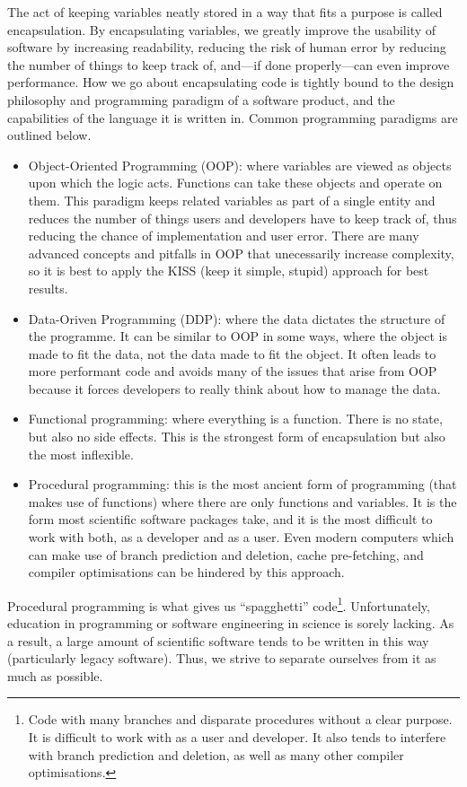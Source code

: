 The act of keeping variables neatly stored in a way that fits a purpose is called encapsulation. By encapsulating variables, we greatly improve the usability of software by increasing readability, reducing the risk of human error by reducing the number of things to keep track of, and---if done properly---can even improve performance. How we go about encapsulating code is tightly bound to the design philosophy and programming paradigm of a software product, and the capabilities of the language it is written in. Common programming paradigms are outlined below.
\begin{itemize}
    \item Object-Oriented Programming (OOP): where variables are viewed as objects upon which the logic acts. Functions can take these objects and operate on them. This paradigm keeps related variables as part of a single entity and reduces the number of things users and developers have to keep track of, thus reducing the chance of implementation and user error. There are many advanced concepts and pitfalls in OOP that unecessarily increase complexity, so it is best to apply the KISS (keep it simple, stupid) approach for best results.
    \item Data-Oriven Programming (DDP): where the data dictates the structure of the programme. It can be similar to OOP in some ways, where the object is made to fit the data, not the data made to fit the object. It often leads to more performant code and avoids many of the issues that arise from OOP because it forces developers to really think about how to manage the data.
    \item Functional programming: where everything is a function. There is no state, but also no side effects. This is the strongest form of encapsulation but also the most inflexible.
    \item Procedural programming: this is the most ancient form of programming (that makes use of functions) where there are only functions and variables. It is the form most scientific software packages take, and it is the most difficult to work with both, as a developer and as a user. Even modern computers which can make use of branch prediction and deletion, cache pre-fetching, and compiler optimisations can be hindered by this approach.
\end{itemize}

Procedural programming is what gives us ``spagghetti'' code\footnote{Code with many branches and disparate procedures without a clear purpose. It is difficult to work with as a user and developer. It also tends to interfere with branch prediction and deletion, as well as many other compiler optimisations.}. Unfortunately, education in programming or software engineering in science is sorely lacking. As a result, a large amount of scientific software tends to be written in this way (particularly legacy software). Thus, we strive to separate ourselves from it as much as possible.

